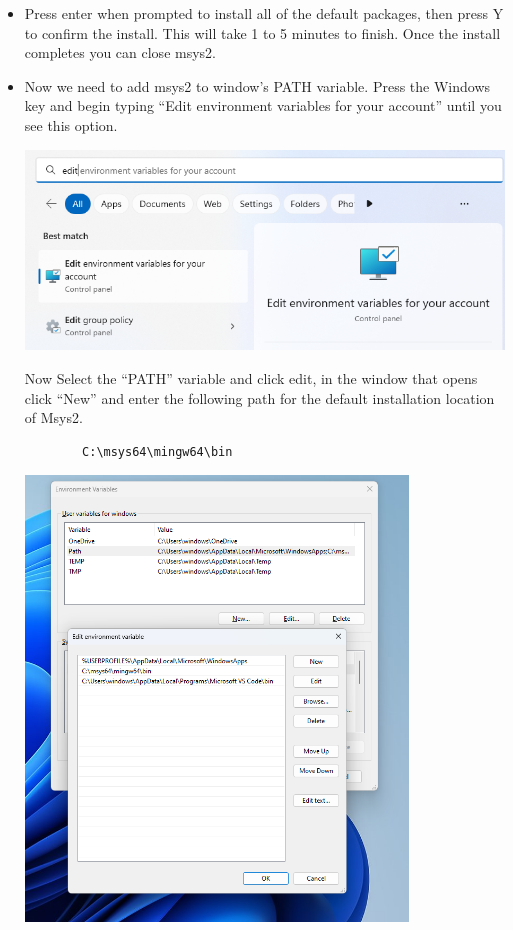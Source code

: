 \begin{itemize}
    \item Press enter when prompted to install all of the default packages, then press Y to confirm the install. This will take 1 to 5 minutes to finish. Once the install completes you can close msys2.
    \item Now we need to add msys2 to window’s PATH variable. Press the Windows key and begin typing  “Edit environment variables for your account” until you see this option.

    \includegraphics[width=5in]{images/windowsVSCodeSetup/image10.png}

    Now Select the “PATH” variable and click edit, in the window that opens click “New” and enter the following path for the default installation location of Msys2.
    
    \begin{verbatim}
        C:\msys64\mingw64\bin
    \end{verbatim}

    \includegraphics[width=4in]{images/windowsVSCodeSetup/image9.png}
     
\end{itemize}

